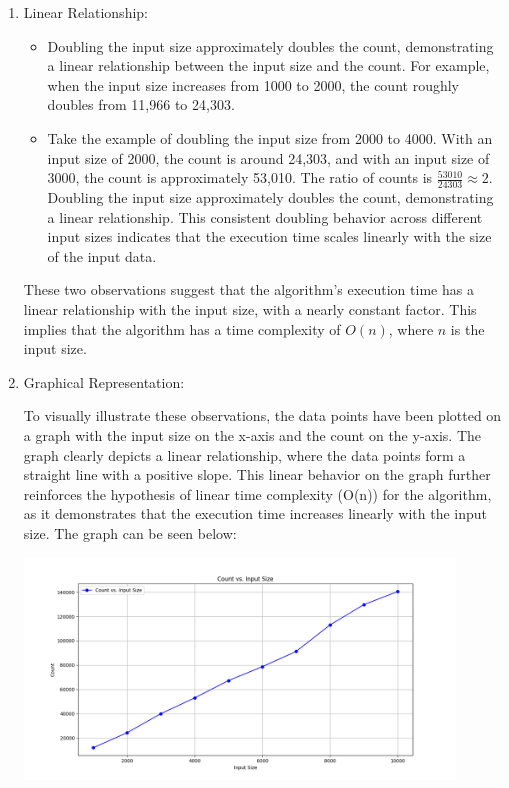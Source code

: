 \documentclass{article}
\begin{document}
\begin{enumerate}
    \item Linear Relationship:
          \begin{itemize}
              \item Doubling the input size approximately doubles the count, demonstrating a linear relationship between the input size and the count. For example, when the input size increases from 1000 to 2000, the count roughly doubles from 11,966 to 24,303.
              \item Take the example of doubling the input size from 2000 to 4000.
                    With an input size of 2000, the count is around 24,303, and with an input size of 3000, the count is approximately 53,010.
                    The ratio of counts is \( \frac{53010}{24303} \approx 2 \).
                    Doubling the input size approximately doubles the count, demonstrating a linear relationship.
                    This consistent doubling behavior across different input sizes indicates that the execution time scales linearly with the size of the input data.
          \end{itemize}
          These two observations suggest that the algorithm's execution time has a linear relationship with the input size, with a nearly constant factor. This implies that the algorithm has a time complexity of \( O(n) \), where \( n \) is the input size.

    \item Graphical Representation:

          To visually illustrate these observations, the data points have been plotted on a graph with the input size on the x-axis and the count on the y-axis.
          The graph clearly depicts a linear relationship, where the data points form a straight line with a positive slope.
          This linear behavior on the graph further reinforces the hypothesis of linear time complexity (O(n)) for the algorithm, as it demonstrates that the execution time increases linearly with the input size.
          The graph can be seen below:
          \begin{center}
              \includegraphics[width=0.9\textwidth]{graph.png}
          \end{center}
\end{enumerate}
\newpage
\end{document}
